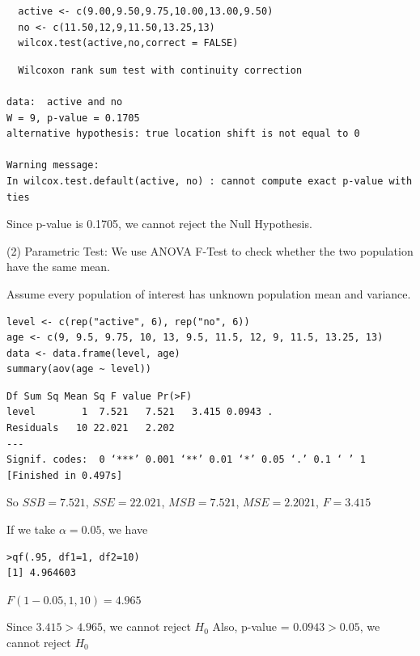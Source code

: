 \documentclass[letterpaper,11pt]{article}
\begin{document}
\begin{lstlisting}
  active <- c(9.00,9.50,9.75,10.00,13.00,9.50)
  no <- c(11.50,12,9,11.50,13.25,13)
  wilcox.test(active,no,correct = FALSE)
\end{lstlisting}

\begin{lstlisting}
  Wilcoxon rank sum test with continuity correction

data:  active and no
W = 9, p-value = 0.1705
alternative hypothesis: true location shift is not equal to 0

Warning message:
In wilcox.test.default(active, no) : cannot compute exact p-value with ties
\end{lstlisting}
\bigbreak

Since p-value is 0.1705, we cannot reject the Null Hypothesis.
\bigbreak

(2) Parametric Test:
We use ANOVA F-Test to check whether the two population have the same mean.\par
Assume every population of interest has unknown population mean and variance.

\begin{lstlisting}
level <- c(rep("active", 6), rep("no", 6))
age <- c(9, 9.5, 9.75, 10, 13, 9.5, 11.5, 12, 9, 11.5, 13.25, 13)
data <- data.frame(level, age)
summary(aov(age ~ level))
\end{lstlisting}

\begin{lstlisting}
Df Sum Sq Mean Sq F value Pr(>F)
level        1  7.521   7.521   3.415 0.0943 .
Residuals   10 22.021   2.202
---
Signif. codes:  0 ‘***’ 0.001 ‘**’ 0.01 ‘*’ 0.05 ‘.’ 0.1 ‘ ’ 1
[Finished in 0.497s]
\end{lstlisting}

So $SSB = 7.521$, $SSE = 22.021$,
$MSB = 7.521$, $MSE = 2.2021$, $F=3.415$

If we take $\alpha = 0.05$, we have


\begin{lstlisting}
>qf(.95, df1=1, df2=10)
[1] 4.964603
\end{lstlisting}

$F(1-0.05,1,10) = 4.965$

Since $3.415>4.965$, we cannot reject $H_0$
\bigbreak
Also, p-value = $0.0943>0.05$, we cannot reject $H_0$
\end{document}
